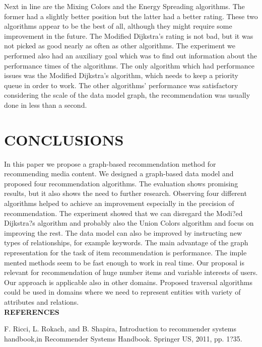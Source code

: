 \documentclass[10pt,slovak,a4paper]{article}
\begin{document}
\begin{multicols}{2}
Next in line are the Mixing Colors and the Energy Spreading algorithms. The former had a slightly better position but the latter had a better rating. These two algorithms appear to be the best of all, although they might require some improvement in the future.
The Modified Dijkstra’s rating is not bad, but it was not picked as good nearly as often as other algorithms. The experiment we performed also had an auxiliary goal which was to find out information about the performance times of the algorithms. The only algorithm which had performance issues was the Modified Dijkstra’s algorithm, which needs to keep a priority queue in order to work. The other algorithms’ performance was satisfactory considering the scale of the data model graph, the recommendation was usually done in less than a second.


\centering \section{CONCLUSIONS}


 In this paper we propose a graph-based recommendation method for recommending media content. We designed a graph-based data model and proposed four recommendation algorithms. The evaluation shows promising results, but it also shows the need to further research. Observing four different algorithms helped to achieve an improvement especially in the precision of recommendation. The experiment showed that we can disregard the Modi?ed Dijkstra?s algorithm and probably also the Union Colors algorithm and focus on improving the rest. The data model can also be improved by instructing new types of relationships, for example keywords. The main advantage of the graph representation for the task of item recommendation is performance. The imple
mented methods seem to be fast enough to work in real time. Our proposal is relevant for recommendation of huge number items and variable interests of users. Our approach is applicable also in other domains. Proposed traversal algorithms could be used in domains where we need to represent entities with variety of attributes and relations. 
\\

\textbf{REFERENCES} 

\centering \begin{thebibliography}{99}

 F. Ricci, L. Rokach, and B. Shapira,
\glqq Introduction to recommender systems handbook,\glqq in Recommender Systems Handbook. Springer US, 2011, pp. 1?35.


\end{thebibliography}
\end{multicols}
\end{document}
